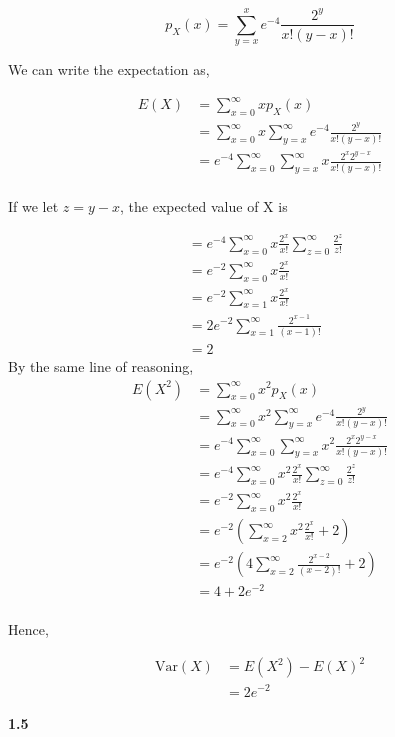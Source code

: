 \documentclass[11pt]{article}
\begin{document}
\[p_{X}(x) = \sum_{y=x}^{x}e^{-4}\frac{2^y}{x!(y-x)!}\]

We can write the expectation as,

\[
\begin{split}
E(X) & = \sum_{x=0}^{\infty}xp_{X}(x) \\
    & = \sum_{x=0}^{\infty}x\sum_{y=x}^{\infty}e^{-4}\frac{2^y}{x!(y-x)!} \\
    & = e^{-4}\sum_{x=0}^{\infty}\sum_{y=x}^{\infty}x\frac{2^x2^{y-x}}{x!(y-x)!} \\
\end{split}
\]

If we let \(z = y-x\), the expected value of X is

\[
\begin{split}
    & = e^{-4}\sum_{x=0}^{\infty}x\frac{2^x}{x!}\sum_{z=0}^{\infty}\frac{2^z}{z!} \\
    & = e^{-2}\sum_{x=0}^{\infty}x\frac{2^x}{x!} \\
    & = e^{-2}\sum_{x=1}^{\infty}x\frac{2^x}{x!} \\
    & = 2e^{-2}\sum_{x=1}^{\infty}\frac{2^{x-1}}{(x-1)!} \\
    & = 2
\end{split}
\] By the same line of reasoning, \[
\begin{split}
E(X^2) & = \sum_{x=0}^{\infty}x^2p_{X}(x) \\
    & = \sum_{x=0}^{\infty}x^2\sum_{y=x}^{\infty}e^{-4}\frac{2^y}{x!(y-x)!} \\
    & = e^{-4}\sum_{x=0}^{\infty}\sum_{y=x}^{\infty}x^2\frac{2^x2^{y-x}}{x!(y-x)!} \\
    & = e^{-4}\sum_{x=0}^{\infty}x^2\frac{2^x}{x!}\sum_{z=0}^{\infty}\frac{2^z}{z!} \\
    & = e^{-2}\sum_{x=0}^{\infty}x^2\frac{2^x}{x!} \\
    & = e^{-2}\left(\sum_{x=2}^{\infty}x^2\frac{2^x}{x!}+2 \right)\\
    & = e^{-2}\left(4\sum_{x=2}^{\infty}\frac{2^{x-2}}{(x-2)!}+2 \right)\\
    & = 4+2e^{-2} \\
\end{split}
\]

Hence,

\[
\begin{split}
\text{Var}(X) & = E(X^2)-E(X)^2\\
    & = 2e^{-2}
\end{split}
\]

    \textbf{1.5}
\end{document}
